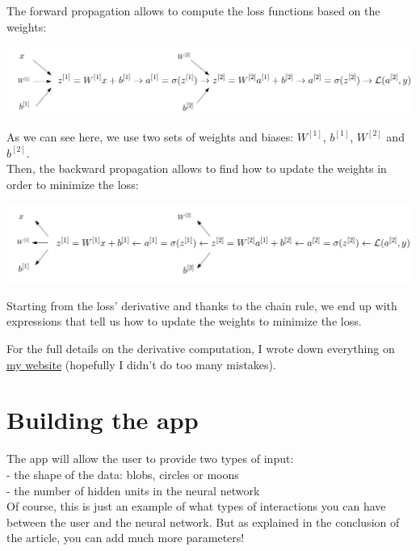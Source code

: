 The forward propagation allows to compute the loss functions based on the weights:

\begin{center}
\includegraphics[scale=0.3]{img/NN_2.png}
\end{center}

As we can see here, we use two sets of weights and biases: $W^{[1]}$, $b^{[1]}$, $W^{[2]}$ and $b^{[2]}$. \\

Then, the backward propagation allows to find how to update the weights in order to minimize the loss:

\begin{center}
\includegraphics[scale=0.3]{img/NN_2_backward.png}
\end{center}

Starting from the loss' derivative and thanks to the chain rule, we end up with expressions that tell us how to update the weights to minimize the loss.

For the full details on the derivative computation, I wrote down everything on \href{https://savoga.github.io/machinelearning/neural-network/}{my website} (hopefully I didn't do too many mistakes).

\section{Building the app}

The app will allow the user to provide two types of input: \\

- the shape of the data: blobs, circles or moons \\

- the number of hidden units in the neural network \\

Of course, this is just an example of what types of interactions you can have between the user and the neural network. But as explained in the conclusion of the article, you can add much more parameters! \\

